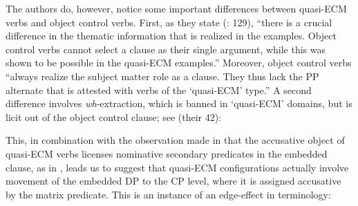 \documentclass[output=paper]{langsci/langscibook}
\begin{document}
    \z

The authors do, however, notice some important differences between quasi-ECM verbs and object control verbs. First, as they state (\citealt{Kotzoglou2007}: 129), “there is a crucial difference in the thematic information that is realized in the  examples. Object control verbs cannot select a clause as their single argument, while this was shown to be possible in the quasi-ECM examples.” Moreover, object control verbs “always realize the subject matter role as a clause. They thus lack the PP alternate that is attested with verbs of the ‘quasi-ECM’ type.” A second difference involves \textit{wh}-extraction, which is banned in  ‘quasi-ECM’ domains, but is licit out of the object control clause; see  (their 42):

\ea%
    \label{ex:alexiadou:43}
    \z
\z

This, in combination with the observation made in \citet{Kotzoglou2007} that the accusative object of quasi-ECM verbs licenses nominative secondary predicates in the embedded clause, as in , leads us to suggest that quasi-ECM configurations actually involve movement of the embedded DP to the CP level, where it is assigned accusative by the matrix predicate. This is an instance of an edge-effect in  terminology:
\end{document}
